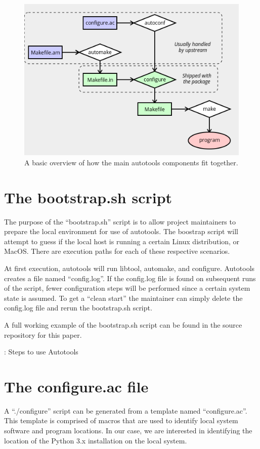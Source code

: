 \begin{figure}[ht]
    \includegraphics[width=12cm]{images/diagram.png}
    \caption{A basic overview of how the main autotools components fit together.}
    \label{diagram}
\end{figure}

\section{\label{sec:bootstrap}The bootstrap.sh script}

The purpose of the ``bootstrap.sh'' script is to allow project maintainers to prepare the local environment for use of autotools.
The boostrap script will attempt to guess if the local host is running a certain Linux distribution, or MacOS. There are execution
paths for each of these respective scenarios.

At first execution, autotools will run libtool, automake, and configure. Autotools creates a file named ``config.log''. If the config.log
file is found on subsequent runs of the script, fewer configuration steps will be performed since a certain system state is assumed. To
get a ``clean start'' the maintainer can simply delete the config.log file and rerun the bootstrap.sh script.

\justifying
A full working example of the bootstrap.sh script can be found in the source repository for this paper.

\begin{mybox}{\thetcbcounter: Steps to use Autotools}
    
\end{mybox}
\vspace{2mm}

\section{\label{sec:config}The configure.ac file}
\vspace{2mm}
\justifying
A ``./configure'' script can be generated from a template named ``configure.ac''. This template is comprised of macros that are used to identify local system
software and program locations. In our case, we are interested in identifying the location of the Python 3.x installation on the local system.

